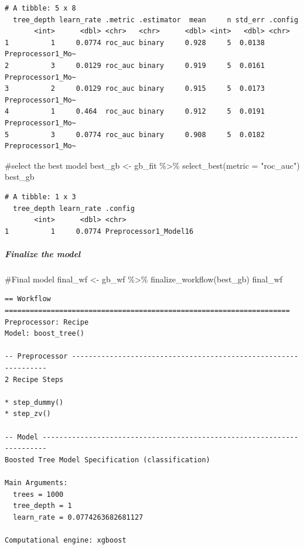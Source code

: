 \documentclass[
]{article}
\let\oldsubparagraph\subparagraph
\renewcommand{\subparagraph}[1]{\oldsubparagraph{#1}\mbox{}}
\newenvironment{Shaded}{\begin{snugshade}}{\end{snugshade}}
\newcommand{\AttributeTok}[1]{\textcolor[rgb]{0.40,0.45,0.13}{#1}}
\newcommand{\CommentTok}[1]{\textcolor[rgb]{0.37,0.37,0.37}{#1}}
\newcommand{\FunctionTok}[1]{\textcolor[rgb]{0.28,0.35,0.67}{#1}}
\newcommand{\NormalTok}[1]{\textcolor[rgb]{0.00,0.23,0.31}{#1}}
\newcommand{\OtherTok}[1]{\textcolor[rgb]{0.00,0.23,0.31}{#1}}
\newcommand{\SpecialCharTok}[1]{\textcolor[rgb]{0.37,0.37,0.37}{#1}}
\newcommand{\StringTok}[1]{\textcolor[rgb]{0.13,0.47,0.30}{#1}}
\begin{document}
\begin{verbatim}
# A tibble: 5 x 8
  tree_depth learn_rate .metric .estimator  mean     n std_err .config          
       <int>      <dbl> <chr>   <chr>      <dbl> <int>   <dbl> <chr>            
1          1     0.0774 roc_auc binary     0.928     5  0.0138 Preprocessor1_Mo~
2          3     0.0129 roc_auc binary     0.919     5  0.0161 Preprocessor1_Mo~
3          2     0.0129 roc_auc binary     0.915     5  0.0173 Preprocessor1_Mo~
4          1     0.464  roc_auc binary     0.912     5  0.0191 Preprocessor1_Mo~
5          3     0.0774 roc_auc binary     0.908     5  0.0182 Preprocessor1_Mo~
\end{verbatim}

\begin{Shaded}
\begin{Highlighting}[]
\CommentTok{\#select the best model}
\NormalTok{best\_gb }\OtherTok{\textless{}{-}}\NormalTok{ gb\_fit }\SpecialCharTok{\%\textgreater{}\%}
  \FunctionTok{select\_best}\NormalTok{(}\AttributeTok{metric =} \StringTok{"roc\_auc"}\NormalTok{)}
\NormalTok{best\_gb}
\end{Highlighting}
\end{Shaded}

\begin{verbatim}
# A tibble: 1 x 3
  tree_depth learn_rate .config              
       <int>      <dbl> <chr>                
1          1     0.0774 Preprocessor1_Model16
\end{verbatim}

\hypertarget{finalize-the-model-4}{%
\subparagraph{Finalize the model}\label{finalize-the-model-4}}

\begin{Shaded}
\begin{Highlighting}[]
\CommentTok{\#Final model}
\NormalTok{final\_wf }\OtherTok{\textless{}{-}}\NormalTok{ gb\_wf }\SpecialCharTok{\%\textgreater{}\%}
  \FunctionTok{finalize\_workflow}\NormalTok{(best\_gb)}
\NormalTok{final\_wf}
\end{Highlighting}
\end{Shaded}

\begin{verbatim}
== Workflow ====================================================================
Preprocessor: Recipe
Model: boost_tree()

-- Preprocessor ----------------------------------------------------------------
2 Recipe Steps

* step_dummy()
* step_zv()

-- Model -----------------------------------------------------------------------
Boosted Tree Model Specification (classification)

Main Arguments:
  trees = 1000
  tree_depth = 1
  learn_rate = 0.0774263682681127

Computational engine: xgboost 
\end{verbatim}
\end{document}
